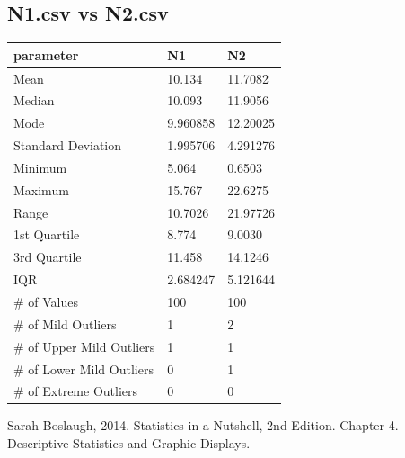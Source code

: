 \documentclass[10pt]{article}
\begin{document}
\subsection*{N1.csv vs N2.csv}

\begin{table}[h!]
  \begin{center}
    \scriptsize
    \begin{tabular}{lll}
      \toprule
      parameter & N1 & N2\\
      \midrule
 	Mean & 10.134 & 11.7082\\
	Median & 10.093 & 11.9056\\
	Mode & 9.960858 & 12.20025\\
	Standard Deviation & 1.995706 & 4.291276\\
	Minimum & 5.064 & 0.6503\\
	Maximum & 15.767 & 22.6275\\
	Range & 10.7026 & 21.97726\\
	1st Quartile & 8.774 & 9.0030\\
	3rd Quartile & 11.458 & 14.1246\\
	IQR & 2.684247 & 5.121644\\   
	\# of Values & 100 & 100\\
	\# of Mild Outliers & 1 & 2\\
	\# of Upper Mild Outliers & 1 & 1\\
	\# of Lower Mild Outliers & 0 & 1\\
	\# of Extreme Outliers & 0 & 0\\
       \bottomrule
    \end{tabular}
  \end{center}
\end{table}

\par
{}%
\hfill
{}%
\par

Sarah Boslaugh, 2014. Statistics in a Nutshell, 2nd Edition. Chapter 4. Descriptive Statistics and Graphic Displays.
\end{document}
